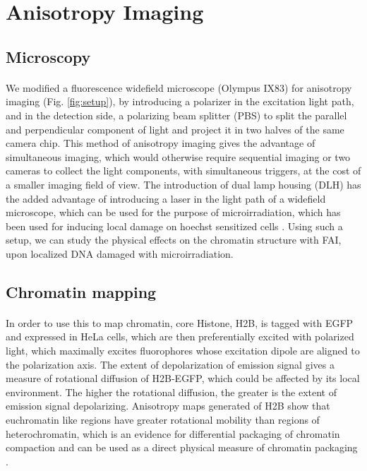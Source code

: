 \section{Anisotropy Imaging}
\subsection{Microscopy}
\paragraph*{} We modified a fluorescence widefield microscope (Olympus IX83) for anisotropy imaging (Fig. \ref{fig:setup}), by introducing a polarizer in the excitation light path, and in the detection side, a polarizing beam splitter (PBS) to split the parallel and perpendicular component of light and project it in two halves of the same camera chip. This method of anisotropy imaging gives the advantage of simultaneous imaging, which would otherwise require sequential imaging or two cameras to collect the light components, with simultaneous triggers, at the cost of a smaller imaging field of view. The introduction of dual lamp housing (DLH) has the added advantage of introducing a laser in the light path of a widefield microscope, which can be used for the purpose of microirradiation, which has been used for inducing local damage on hoechst sensitized cells \cite{BURGESS20141703}. Using such a setup, we can study the physical effects on the chromatin structure with FAI, upon localized DNA damaged with microirradiation.

\subsection{Chromatin mapping}
\paragraph*{} In order to use this to map chromatin, core Histone, H2B, is tagged with EGFP and expressed in HeLa cells, which are then preferentially excited with polarized light, which maximally excites fluorophores whose excitation dipole are aligned to the polarization axis. The extent of depolarization of emission signal gives a measure of rotational diffusion of H2B-EGFP, which could be affected by its local environment. The higher the rotational diffusion, the greater is the extent of emission signal depolarizing. Anisotropy maps generated of H2B show that euchromatin like regions have greater rotational mobility than regions of heterochromatin, which is an evidence for differential packaging of chromatin compaction and can be used as a direct physical measure of chromatin packaging \cite{bhattacharya2009spatio}.

